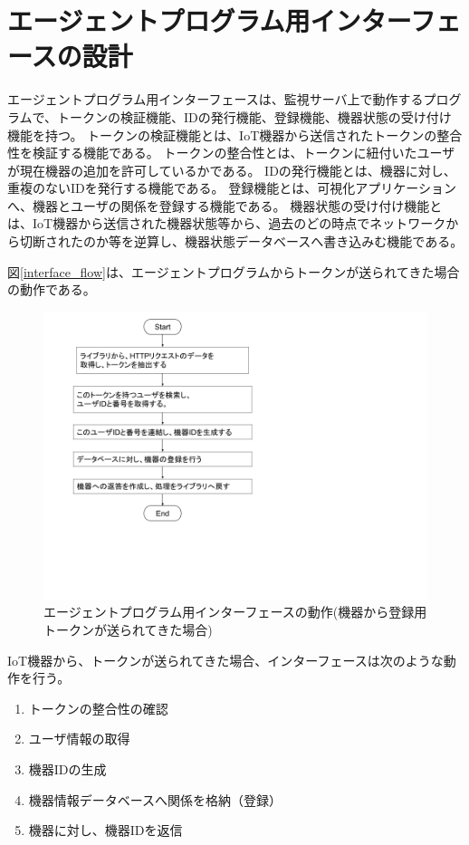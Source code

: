 \section{エージェントプログラム用インターフェースの設計}
エージェントプログラム用インターフェースは、監視サーバ上で動作するプログラムで、トークンの検証機能、IDの発行機能、登録機能、機器状態の受け付け機能を持つ。
トークンの検証機能とは、IoT機器から送信されたトークンの整合性を検証する機能である。
トークンの整合性とは、トークンに紐付いたユーザが現在機器の追加を許可しているかである。
IDの発行機能とは、機器に対し、重複のないIDを発行する機能である。
登録機能とは、可視化アプリケーションへ、機器とユーザの関係を登録する機能である。
機器状態の受け付け機能とは、IoT機器から送信された機器状態等から、過去のどの時点でネットワークから切断されたのか等を逆算し、機器状態データベースへ書き込みむ機能である。

図\ref{interface_flow}は、エージェントプログラムからトークンが送られてきた場合の動作である。
\begin{figure}[htbp]
\includegraphics[width=16cm]{images/interface_flow.png}
\caption{エージェントプログラム用インターフェースの動作(機器から登録用トークンが送られてきた場合)}
\label{fig:interface_flow}
\end{figure}
IoT機器から、トークンが送られてきた場合、インターフェースは次のような動作を行う。
\begin{enumerate}
\item トークンの整合性の確認
\item ユーザ情報の取得
\item 機器IDの生成
\item 機器情報データベースへ関係を格納（登録）
\item 機器に対し、機器IDを返信
\end{enumerate}

